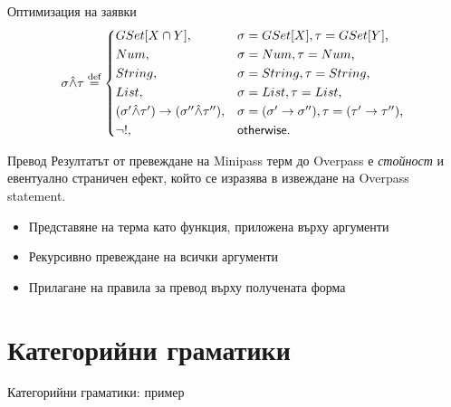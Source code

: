 \documentclass[9pt]{beamer}
\begin{document}
  \begin{frame}{Оптимизация на заявки}
\[
    \sigma \unify \tau \defeq
    \begin{cases*}
        GSet[X \cap Y] ,& $\sigma = GSet[X], \tau = GSet[Y]$, \\
        Num ,& $\sigma = Num, \tau = Num$, \\
        String ,& $\sigma = String, \tau = String$, \\
        List ,& $\sigma = List, \tau = List$, \\
        (\sigma' \unify \tau') \tot (\sigma'' \unify \tau''), &
        $\sigma = (\sigma' \tot \sigma''), \tau = (\tau' \tot \tau'')$, \\
        \lnot ! ,& $\mathsf{otherwise}$. \\
    \end{cases*}
\]
  \end{frame}

  \begin{frame}{Превод}
    Резултатът от превеждане на Minipass терм до Overpass е \emph{стойност}
    и евентуално страничен ефект, който се изразява в извеждане на Overpass
    statement.

    \begin{itemize}
      \item Представяне на терма като функция, приложена върху аргументи
      \item Рекурсивно превеждане на всички аргументи
      \item Прилагане на правила за превод върху получената форма
    \end{itemize}
  \end{frame}
  \section{Категорийни граматики}
  \begin{frame}{Категорийни граматики: пример}
  \end{frame}
\end{document}
